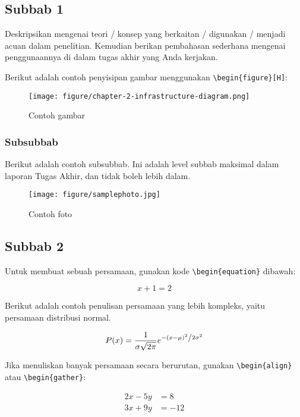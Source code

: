 \subsection{Subbab 1} \label{II.Subbab1}
Deskripsikan mengenai teori / konsep yang berkaitan / digunakan / menjadi acuan dalam penelitian. Kemudian berikan pembahasan sederhana mengenai penggunaannya di dalam tugas akhir yang Anda kerjakan. \par

Berikut adalah contoh penyisipan gambar menggunakan \verb|\begin{figure}[H]|:

\begin{figure}[H] %
    \centering
    \texttt{[image: figure/chapter-2-infrastructure-diagram.png]}
    \caption{Contoh gambar}
    \label{fig:2.contoh}
\end{figure}

\subsubsection{Subsubbab} \label{II.Subsubbab1}

Berikut adalah contoh subsubbab. Ini adalah level subbab maksimal dalam laporan Tugas Akhir, dan tidak boleh lebih dalam.

\begin{figure}[H]
	\centering
	\texttt{[image: figure/samplephoto.jpg]}
	\caption{Contoh foto}
	\label{fig:2.foto}
\end{figure}

\subsection{Subbab 2} \label{II.Subbab2}
Untuk membuat sebuah persamaan, gunakan kode \verb|\begin{equation}| dibawah: \par

\begin{equation}
	x + 1 = 2
\end{equation}
\label{eq:2.sum}

Berikut adalah contoh penulisan persamaan yang lebih kompleks, yaitu persamaan distribusi normal. \par

\begin{equation}
	P(x) = \frac{1}{{\sigma \sqrt {2\pi } }}e^{{{ - \left( {x - \mu } \right)^2 } \mathord{\left/ {\vphantom {{ - \left( {x - \mu } \right)^2 } {2\sigma ^2 }}} \right. \kern-\nulldelimiterspace} {2\sigma ^2 }}}
\end{equation}
\label{eq:2.normal}

Jika menuliskan banyak persamaan secara berurutan, gunakan  \verb|\begin{align}| atau \verb|\begin{gather}|: \par

\begin{align} 
	2x - 5y &=  8 \\ 
	3x + 9y &=  -12
\end{align}
\label{eq:2.SPL}
